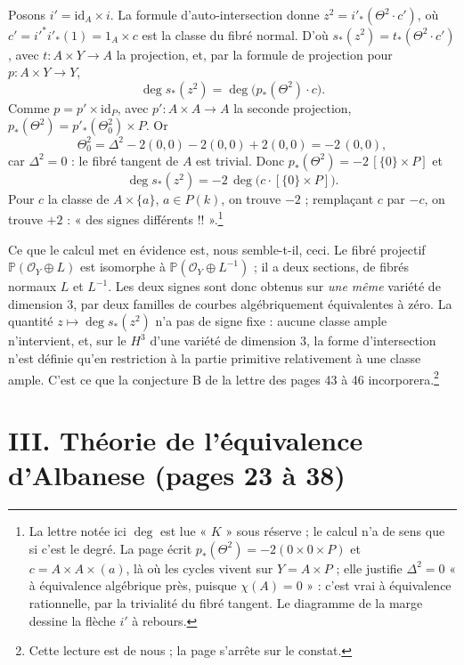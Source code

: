 \documentclass[11pt,a4paper]{article}
\begin{document}
Posons $i' = \mathrm{id}_{A} \times i$. La formule d'auto-intersection donne
$z^{2} = i'_{*}(\Theta^{2} \cdot c')$, où $c' = i'^{*}i'_{*}(1) = 1_{A} \times
c$ est la classe du fibré normal. D'où $s_{*}(z^{2}) = t_{*}(\Theta^{2}\cdot
c')$, avec $t \colon A \times Y \to A$ la projection, et, par la formule de
projection pour $p \colon A \times Y \to Y$,
\[
\deg s_{*}(z^{2}) = \deg\bigl(p_{*}(\Theta^{2}) \cdot c\bigr) .
\]
Comme $p = p' \times \mathrm{id}_{P}$, avec $p' \colon A \times A \to A$ la
seconde projection, $p_{*}(\Theta^{2}) = p'_{*}(\Theta_{0}^{2}) \times P$. Or
\[
\Theta_{0}^{2} = \Delta^{2} - 2(0,0) - 2(0,0) + 2(0,0) = -2\,(0,0) ,
\]
car $\Delta^{2} = 0$ : le fibré tangent de $A$ est trivial. Donc
$p_{*}(\Theta^{2}) = -2\,[\{0\} \times P]$ et
\[
\deg s_{*}(z^{2}) = -2\,\deg\bigl(c \cdot [\{0\} \times P]\bigr) .
\]
Pour $c$ la classe de $A \times \{a\}$, $a \in P(k)$, on trouve $-2$ ;
remplaçant $c$ par $-c$, on trouve $+2$ : « des signes différents
!! ».\footnote{La lettre notée ici $\deg$ est lue « $K$ » sous réserve ; le
calcul n'a de sens que si c'est le degré. La page écrit $p_{*}(\Theta^{2}) =
-2(0 \times 0 \times P)$ et $c = A \times A \times (a)$, là où les cycles vivent
sur $Y = A \times P$ ; elle justifie $\Delta^{2} = 0$ « à équivalence
algébrique près, puisque $\chi(A) = 0$ » : c'est vrai à équivalence
rationnelle, par la trivialité du fibré tangent. Le diagramme de la marge
dessine la flèche $i'$ à rebours.}

Ce que le calcul met en évidence est, nous semble-t-il, ceci. Le fibré
projectif $\mathbb{P}(\mathcal{O}_{Y} \oplus L)$ est isomorphe à
$\mathbb{P}(\mathcal{O}_{Y} \oplus L^{-1})$ ; il a deux sections, de fibrés
normaux $L$ et $L^{-1}$. Les deux signes sont donc obtenus sur \emph{une même}
variété de dimension $3$, par deux familles de courbes algébriquement
équivalentes à zéro. La quantité $z \mapsto \deg s_{*}(z^{2})$ n'a pas de signe
fixe : aucune classe ample n'intervient, et, sur le $H^{3}$ d'une variété de
dimension $3$, la forme d'intersection n'est définie qu'en restriction à la
partie primitive relativement à une classe ample. C'est ce que la conjecture B
de la lettre des pages 43 à 46 incorporera.\footnote{Cette lecture est de nous ;
la page s'arrête sur le constat.}

\section*{III. Théorie de l'équivalence d'Albanese (pages 23 à 38)}
\end{document}

